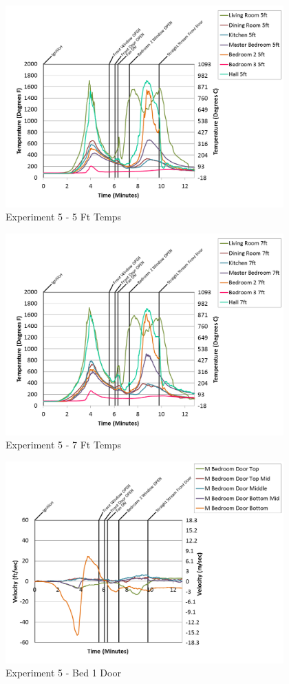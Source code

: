 \documentclass{article}
\begin{document}
\begin{appendices}
\begin{figure}[h!]
	\centering
	\includegraphics[height=3.05in]{0_Images/Results_Charts/Exp_5_Charts/5FtTemps.png}
	\caption{Experiment 5 - 5 Ft Temps}
\end{figure}


\begin{figure}[h!]
	\centering
	\includegraphics[height=3.05in]{0_Images/Results_Charts/Exp_5_Charts/7FtTemps.png}
	\caption{Experiment 5 - 7 Ft Temps}
\end{figure}

\clearpage

\begin{figure}[h!]
	\centering
	\includegraphics[height=3.05in]{0_Images/Results_Charts/Exp_5_Charts/Bed1Door.png}
	\caption{Experiment 5 - Bed 1 Door}
\end{figure}



\end{appendices}
\end{document}
